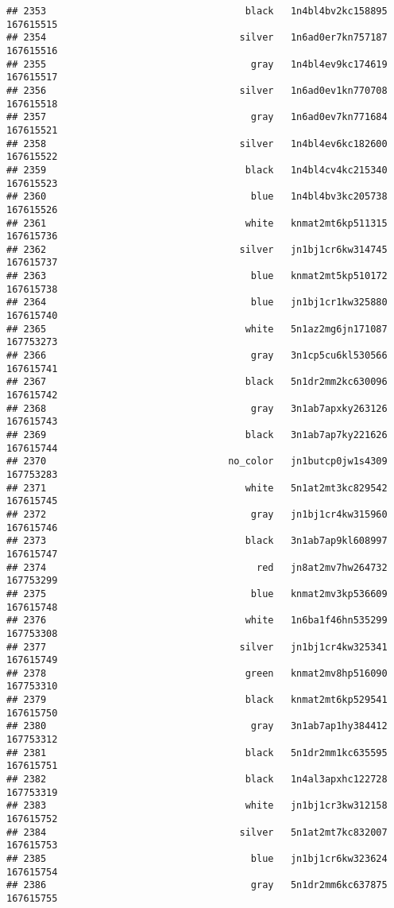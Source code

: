 \documentclass[
]{article}
\begin{document}
\begin{verbatim}
## 2353                                   black   1n4bl4bv2kc158895 167615515
## 2354                                  silver   1n6ad0er7kn757187 167615516
## 2355                                    gray   1n4bl4ev9kc174619 167615517
## 2356                                  silver   1n6ad0ev1kn770708 167615518
## 2357                                    gray   1n6ad0ev7kn771684 167615521
## 2358                                  silver   1n4bl4ev6kc182600 167615522
## 2359                                   black   1n4bl4cv4kc215340 167615523
## 2360                                    blue   1n4bl4bv3kc205738 167615526
## 2361                                   white   knmat2mt6kp511315 167615736
## 2362                                  silver   jn1bj1cr6kw314745 167615737
## 2363                                    blue   knmat2mt5kp510172 167615738
## 2364                                    blue   jn1bj1cr1kw325880 167615740
## 2365                                   white   5n1az2mg6jn171087 167753273
## 2366                                    gray   3n1cp5cu6kl530566 167615741
## 2367                                   black   5n1dr2mm2kc630096 167615742
## 2368                                    gray   3n1ab7apxky263126 167615743
## 2369                                   black   3n1ab7ap7ky221626 167615744
## 2370                                no_color   jn1butcp0jw1s4309 167753283
## 2371                                   white   5n1at2mt3kc829542 167615745
## 2372                                    gray   jn1bj1cr4kw315960 167615746
## 2373                                   black   3n1ab7ap9kl608997 167615747
## 2374                                     red   jn8at2mv7hw264732 167753299
## 2375                                    blue   knmat2mv3kp536609 167615748
## 2376                                   white   1n6ba1f46hn535299 167753308
## 2377                                  silver   jn1bj1cr4kw325341 167615749
## 2378                                   green   knmat2mv8hp516090 167753310
## 2379                                   black   knmat2mt6kp529541 167615750
## 2380                                    gray   3n1ab7ap1hy384412 167753312
## 2381                                   black   5n1dr2mm1kc635595 167615751
## 2382                                   black   1n4al3apxhc122728 167753319
## 2383                                   white   jn1bj1cr3kw312158 167615752
## 2384                                  silver   5n1at2mt7kc832007 167615753
## 2385                                    blue   jn1bj1cr6kw323624 167615754
## 2386                                    gray   5n1dr2mm6kc637875 167615755

\end{verbatim}
\end{document}
